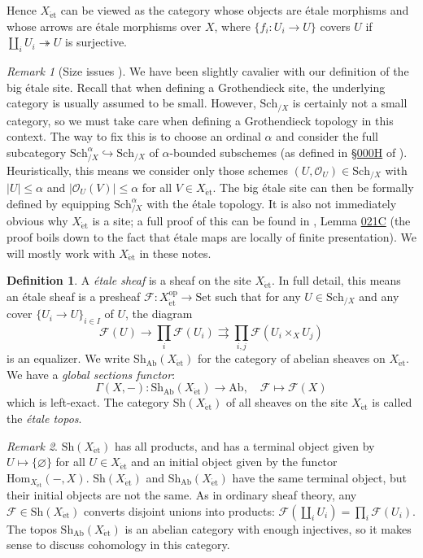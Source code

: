 \documentclass{article}
\def\~#1{\mathscr{#1}}
\numberwithin{equation}{section}
\numberwithin{figure}{section}
\newcommand{\Hom}{\mathrm{Hom}}
\newcommand{\epi}{\twoheadrightarrow}
\newcommand{\mono}{\hookrightarrow}
\newcommand{\op}{\mathrm{op}}
\newcommand{\et}{\acute{\mathrm{e}}\mathrm{t}}
\newcommand{\Set}{\mathrm{Set}}
\newcommand{\Ab}{\mathrm{Ab}}
\newcommand{\Sh}{\mathrm{Sh}}
\newcommand{\Sch}{\mathrm{Sch}}
\theoremstyle{plain}
\theoremstyle{definition}
\newtheorem{defn}[thm]{Definition}
\theoremstyle{remark}
\newtheorem*{rmk}{Remark}
\begin{document}
Hence $X_{\et}$ can be viewed as the category whose objects are \'etale morphisms and whose arrows are \'etale morphisms over $X$, where $\{f_i: U_i \to U\}$ covers $U$ if $\coprod_i U_i \epi U$ is surjective.

\begin{rmk}[Size issues \frownie]
    We have been slightly cavalier with our definition of the big \'etale site. Recall that when defining a Grothendieck site, the underlying category is usually assumed to be small. However, $\Sch_{/X}$ is certainly not a small category, so we must take care when defining a Grothendieck topology in this context. The way to fix this is to choose an ordinal $\alpha$ and consider the full subcategory $\Sch_{/X}^\alpha \mono \Sch_{/X}$ of $\alpha$-bounded subschemes (as defined in \href{https://stacks.math.columbia.edu/tag/000H}{\S000H} of \cite{stacks}). Heuristically, this means we consider only those schemes $(U, \~O_U) \in \Sch_{/X}$ with $|U| \le \alpha$ and $|\~O_U(V)| \le \alpha$ for all $V \in X_{\et}$. The big \'etale site can then be formally defined by equipping $\Sch_{/X}^\alpha$ with the \'etale topology. It is also not immediately obvious why $X_{\et}$ is a site; a full proof of this can be found in \cite{stacks}, Lemma \href{https://stacks.math.columbia.edu/tag/021C}{021C} (the proof boils down to the fact that \'etale maps are locally of finite presentation). We will mostly work with $X_{\et}$ in these notes.
\end{rmk}

\begin{defn}
    A \emph{\'etale sheaf} is a sheaf on the site $X_{\et}$. In full detail, this means an \'etale sheaf is a presheaf $\~F: X_{\et}^\op \to \Set$ such that for any $U \in \Sch_{/X}$ and any cover $\{U_i \to U\}_{i \in I}$ of $U$, the diagram
    \[\~F(U) \to \prod_i \~F(U_i) \rightrightarrows \prod_{i,j} \~F(U_i \times_X U_j)\]
    is an equalizer. We write $\Sh_{\Ab}(X_{\et})$ for the category of abelian sheaves on $X_{\et}$. We have a \emph{global sections functor}:  
    \[\Gamma(X, -): \Sh_{\Ab}(X_{\et}) \to \Ab, \quad \~F \mapsto \~F(X)\]
    which is left-exact. The category $\Sh(X_{\et})$ of all sheaves on the site $X_{\et}$ is called the \emph{\'etale topos}.
\end{defn}

\begin{rmk}
$\Sh(X_{\et})$ has all products, and has a terminal object given by $U \mapsto \{\varnothing\}$ for all $U \in X_{\et}$ and an initial object given by the functor $\Hom_{X_{\et}}(-, X)$. $\Sh(X_{\et})$ and $\Sh_{\Ab}(X_{\et})$ have the same terminal object, but their initial objects are not the same. As in ordinary sheaf theory, any $\~F \in \Sh(X_{\et})$ converts disjoint unions into products: $\~F\left(\coprod_i U_i\right) = \prod_i \~F(U_i)$. The topos $\Sh_{\Ab}(X_{\et})$ is an abelian category with enough injectives, so it makes sense to discuss cohomology in this category.
\end{rmk}
\end{document}
